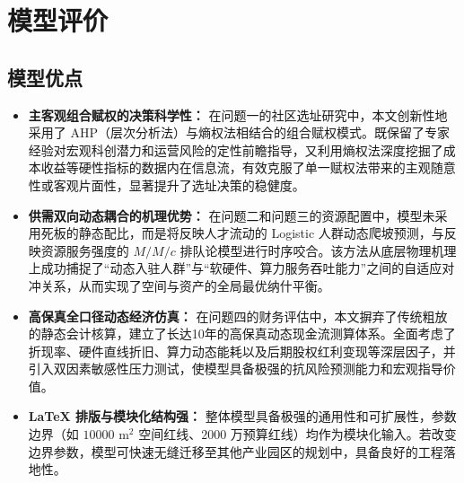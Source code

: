 \documentclass[12pt,a4paper]{article}
\begin{document}
\section{模型评价}
\subsection{模型优点}
\begin{itemize}
    \item \textbf{主客观组合赋权的决策科学性：}
    在问题一的社区选址研究中，本文创新性地采用了 AHP（层次分析法）与熵权法相结合的组合赋权模式。既保留了专家经验对宏观科创潜力和运营风险的定性前瞻指导，又利用熵权法深度挖掘了成本收益等硬性指标的数据内在信息流，有效克服了单一赋权法带来的主观随意性或客观片面性，显著提升了选址决策的稳健度。
    
    \item \textbf{供需双向动态耦合的机理优势：}
    在问题二和问题三的资源配置中，模型未采用死板的静态配比，而是将反映人才流动的 Logistic 人群动态爬坡预测，与反映资源服务强度的 $M/M/c$ 排队论模型进行时序咬合。该方法从底层物理机理上成功捕捉了“动态入驻人群”与“软硬件、算力服务吞吐能力”之间的自适应对冲关系，从而实现了空间与资产的全局最优纳什平衡。
    
    \item \textbf{高保真全口径动态经济仿真：}
    在问题四的财务评估中，本文摒弃了传统粗放的静态会计核算，建立了长达10年的高保真动态现金流测算体系。全面考虑了折现率、硬件直线折旧、算力动态能耗以及后期股权红利变现等深层因子，并引入双因素敏感性压力测试，使模型具备极强的抗风险预测能力和宏观指导价值。
    
    \item \textbf{ LaTeX 排版与模块化结构强：}
    整体模型具备极强的通用性和可扩展性，参数边界（如 $10000 \text{ m}^2$ 空间红线、$2000$ 万预算红线）均作为模块化输入。若改变边界参数，模型可快速无缝迁移至其他产业园区的规划中，具备良好的工程落地性。
\end{itemize}
\end{document}
